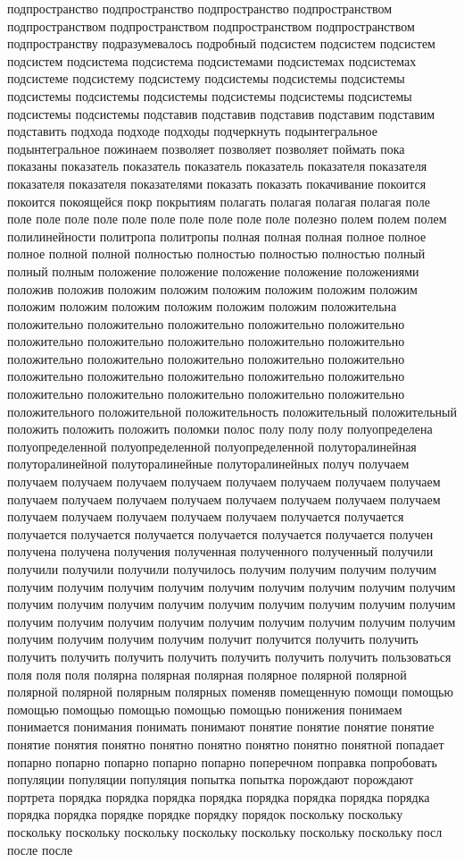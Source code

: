 подпространство подпространство подпространство подпространством подпространством подпространством подпространством подпространством подпространству подразумевалось подробный подсистем подсистем подсистем подсистем подсистема подсистема подсистемами подсистемах подсистемах подсистеме подсистему подсистему подсистемы подсистемы подсистемы подсистемы подсистемы подсистемы подсистемы подсистемы подсистемы подсистемы подсистемы подставив подставив подставив подставим подставим подставить подхода подходе подходы подчеркнуть подынтегральное подынтегральное пожинаем позволяет позволяет позволяет поймать пока показаны показатель показатель показатель показатель показателя показателя показателя показателя показателями показать показать покачивание покоится покоится покоящейся покр покрытиям полагать полагая полагая полагая поле поле поле поле поле поле поле поле поле поле поле полезно полем полем полем полилинейности политропа политропы полная полная полная полное полное полное полной полной полностью полностью полностью полностью полный полный полным положение положение положение положение положениями положив положив положим положим положим положим положим положим положим положим положим положим положим положим положительна положительно положительно положительно положительно положительно положительно положительно положительно положительно положительно положительно положительно положительно положительно положительно положительно положительно положительно положительно положительно положительно положительно положительно положительно положительно положительного положительной положительность положительный положительный положить положить положить поломки полос полу полу полу полуопределена полуопределенной полуопределенной полуопределенной полуторалинейная полуторалинейной полуторалинейные полуторалинейных получ получаем получаем получаем получаем получаем получаем получаем получаем получаем получаем получаем получаем получаем получаем получаем получаем получаем получаем получаем получаем получаем получаем получается получается получается получается получается получается получается получается получен получена получена получения полученная полученного полученный получили получили получили получили получилось получим получим получим получим получим получим получим получим получим получим получим получим получим получим получим получим получим получим получим получим получим получим получим получим получим получим получим получим получим получим получим получим получим получим получим получит получится получить получить получить получить получить получить получить получить получить пользоваться поля поля поля полярна полярная полярная полярное полярной полярной полярной полярной полярным полярных поменяв помещенную помощи помощью помощью помощью помощью помощью помощью понижения понимаем понимается понимания понимать понимают понятие понятие понятие понятие понятие понятия понятно понятно понятно понятно понятно понятной попадает попарно попарно попарно попарно попарно поперечном поправка попробовать популяции популяции популяция попытка попытка порождают порождают портрета порядка порядка порядка порядка порядка порядка порядка порядка порядка порядка порядке порядке порядку порядок поскольку поскольку поскольку поскольку поскольку поскольку поскольку поскольку поскольку посл после после 